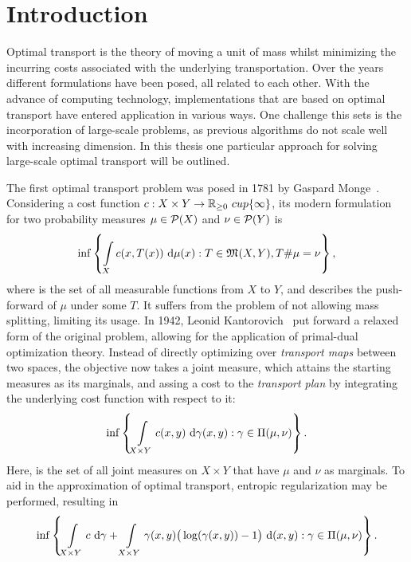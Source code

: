 \chapter*{Introduction}

Optimal transport is the theory of moving a unit of mass whilst minimizing the incurring costs associated with the underlying transportation. Over the years different formulations have been posed, all related to each other. With the advance of computing technology, implementations that are based on optimal transport have entered application in various ways. One challenge this sets is the incorporation of large-scale problems, as previous algorithms do not scale well with increasing dimension. In this thesis one particular approach for solving large-scale optimal transport will be outlined.

The first optimal transport problem was posed in 1781 by Gaspard Monge\ \cite{Mon1781}. Considering a cost function $\map[c]{X \times Y}{\RZero \ cup \{ \infty \}}$, its modern formulation for two probability measures $\mu \in \PM{X}$ and $\nu \in \PM{Y}$ is
\[ \inf \left\{ \int\limits_X c(x, T(x))~\Dx{\mu} : T \in \MF{X}{Y}, \push{\mu} = \nu \right\}, \]
where  is the set of all measurable functions from $X$ to $Y$, and \push{\mu} describes the push-forward of $\mu$ under some $T$.
It suffers from the problem of not allowing mass splitting, limiting its usage. In 1942, Leonid Kantorovich\ \cite{Kan1942} put forward a relaxed form of the original problem, allowing for the application of primal-dual optimization theory. Instead of directly optimizing over \textit{transport maps} between two spaces, the objective now takes a joint measure, which attains the starting measures as its marginals, and assing a cost to the \textit{transport plan} by integrating the underlying cost function with respect to it:
\[ \inf \left\{ \int\limits_{X \times Y} c(x, y)~\Dx[x, y]{\gamma} : \gamma \in \TP{\mu}{\nu} \right\}. \]
Here, \TP{\mu}{\nu} is the set of all joint measures on $X \times Y$ that have $\mu$ and $\nu$ as marginals. To aid in the approximation of optimal transport, entropic regularization may be performed, resulting in
\[ \inf \left\{ \int\limits_{X \times Y} c~\D[\gamma] + \int\limits_{X \times Y} \gamma(x, y) \big( \log(\gamma(x, y)) - 1 \big)~\D[(x, y)] : \gamma \in \TP{\mu}{\nu} \right\}. \]

